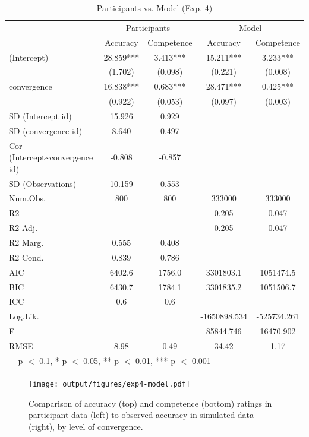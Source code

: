 \documentclass[
  doc,floatsintext]{apa6}
\begin{document}
\begin{table}

\caption{\label{tab:model-vs-participant-table}Participants vs. Model (Exp. 4)}
\centering
\begin{tabular}[t]{lcccc}
\toprule
\multicolumn{1}{c}{ } & \multicolumn{2}{c}{Participants} & \multicolumn{2}{c}{Model} \\
\cmidrule(l{3pt}r{3pt}){2-3} \cmidrule(l{3pt}r{3pt}){4-5}
  & Accuracy & Competence & Accuracy  & Competence \\
\midrule
(Intercept) & 28.859*** & 3.413*** & 15.211*** & 3.233***\\
 & (1.702) & (0.098) & (0.221) & (0.008)\\
convergence & 16.838*** & 0.683*** & 28.471*** & 0.425***\\
 & (0.922) & (0.053) & (0.097) & (0.003)\\
SD (Intercept id) & 15.926 & 0.929 &  & \\
SD (convergence id) & 8.640 & 0.497 &  & \\
Cor (Intercept\textasciitilde{}convergence id) & -0.808 & -0.857 &  & \\
SD (Observations) & 10.159 & 0.553 &  & \\
\midrule
Num.Obs. & 800 & 800 & 333000 & 333000\\
R2 &  &  & 0.205 & 0.047\\
R2 Adj. &  &  & 0.205 & 0.047\\
R2 Marg. & 0.555 & 0.408 &  & \\
R2 Cond. & 0.839 & 0.786 &  & \\
AIC & 6402.6 & 1756.0 & 3301803.1 & 1051474.5\\
BIC & 6430.7 & 1784.1 & 3301835.2 & 1051506.7\\
ICC & 0.6 & 0.6 &  & \\
Log.Lik. &  &  & -1650898.534 & -525734.261\\
F &  &  & 85844.746 & 16470.902\\
RMSE & 8.98 & 0.49 & 34.42 & 1.17\\
\bottomrule
\multicolumn{5}{l}{\rule{0pt}{1em}+ p $<$ 0.1, * p $<$ 0.05, ** p $<$ 0.01, *** p $<$ 0.001}\\
\end{tabular}
\end{table}



\begin{figure}
\centering
\texttt{[image: output/figures/exp4-model.pdf]}
\caption{\label{fig:exp4-model}Comparison of accuracy (top) and competence (bottom) ratings in participant data (left) to observed accuracy in simulated data (right), by level of convergence.}
\end{figure}
\end{document}
